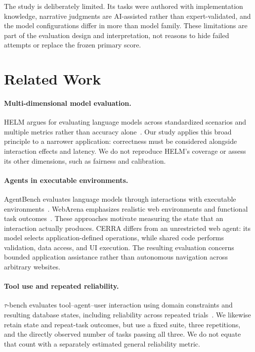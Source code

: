 \documentclass[10pt,twocolumn,letterpaper]{article}
\begin{document}
The study is deliberately limited. Its tasks were authored with implementation knowledge, narrative judgments are AI-assisted rather than expert-validated, and the model configurations differ in more than model family. These limitations are part of the evaluation design and interpretation, not reasons to hide failed attempts or replace the frozen primary score.

\section{Related Work}
\paragraph{Multi-dimensional model evaluation.}
HELM argues for evaluating language models across standardized scenarios and multiple metrics rather than accuracy alone~\cite{helm}. Our study applies this broad principle to a narrower application: correctness must be considered alongside interaction effects and latency. We do not reproduce HELM's coverage or assess its other dimensions, such as fairness and calibration.

\paragraph{Agents in executable environments.}
AgentBench evaluates language models through interactions with executable environments~\cite{agentbench}. WebArena emphasizes realistic web environments and functional task outcomes~\cite{webarena}. These approaches motivate measuring the state that an interaction actually produces. CERRA differs from an unrestricted web agent: its model selects application-defined operations, while shared code performs validation, data access, and UI execution. The resulting evaluation concerns bounded application assistance rather than autonomous navigation across arbitrary websites.

\paragraph{Tool use and repeated reliability.}
$\tau$-bench evaluates tool--agent--user interaction using domain constraints and resulting database states, including reliability across repeated trials~\cite{taubench}. We likewise retain state and repeat-task outcomes, but use a fixed suite, three repetitions, and the directly observed number of tasks passing all three. We do not equate that count with a separately estimated general reliability metric.
\end{document}
